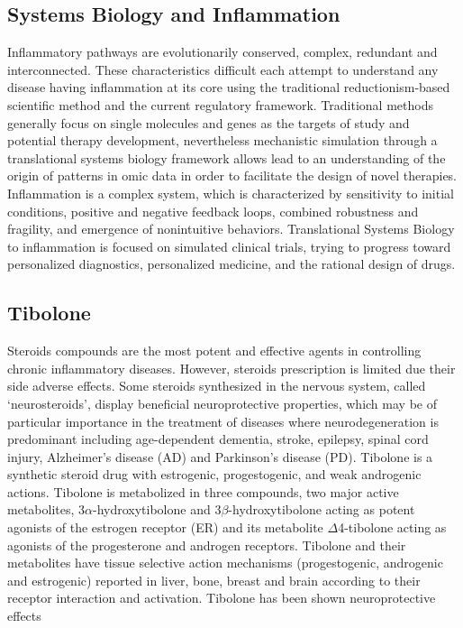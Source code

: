 \subsection*{Systems Biology and  Inflammation}
Inflammatory pathways are evolutionarily conserved, complex, redundant and interconnected. These characteristics difficult each attempt to understand any disease having inflammation at its core using the traditional reductionism-based scientific method and the current regulatory framework. Traditional methods generally focus on single molecules and genes as the targets of study and potential therapy development, nevertheless mechanistic simulation through a translational systems biology framework allows lead to an understanding of the origin of patterns in omic data in order to facilitate the design of novel therapies. Inflammation is a complex system, which is characterized by sensitivity to initial conditions, positive and negative feedback loops, combined robustness and fragility, and emergence of nonintuitive behaviors. Translational Systems Biology to inflammation is focused on simulated clinical trials, trying to progress toward personalized diagnostics, personalized medicine, and the rational design of drugs.


\subsection*{Tibolone}
Steroids compounds are the most potent and effective agents in controlling chronic inflammatory diseases. However, steroids prescription is limited due their side adverse effects. Some steroids synthesized in the nervous system, called ‘neurosteroids’, display beneficial neuroprotective properties, which may be of particular importance in the treatment of diseases where neurodegeneration is predominant including age-dependent dementia, stroke, epilepsy, spinal cord injury, Alzheimer’s disease (AD) and Parkinson’s disease (PD).
Tibolone is a synthetic steroid drug with estrogenic, progestogenic, and weak androgenic actions. Tibolone is metabolized in three compounds, two major active metabolites, 3$\alpha$-hydroxytibolone and 3$\beta$-hydroxytibolone acting as potent agonists of the estrogen receptor (ER) and its metabolite $\Delta$4-tibolone acting as agonists of the progesterone and androgen receptors. Tibolone and their metabolites have tissue selective action mechanisms (progestogenic, androgenic and estrogenic) reported in liver, bone, breast and brain according to their receptor interaction and activation.
Tibolone has been shown neuroprotective effects 







